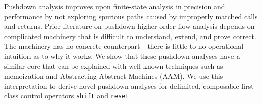 Pushdown analysis improves upon finite-state analysis in precision and performance by not exploring spurious paths caused by improperly matched calls and returns.
%
Prior literature on pushdown higher-order flow analysis depends on complicated machinery that is difficult to understand, extend, and prove correct.
%
The machinery has no concrete counterpart---there is little to no operational intuition as to why it works.
%
We show that these pushdown analyses have a similar core that can be explained with well-known techniques such as memoization and Abstracting Abstract Machines (AAM).
%
We use this interpretation to derive novel pushdown analyses for delimited, composable first-class control operators \texttt{shift} and \texttt{reset}.

